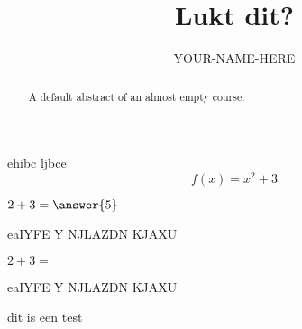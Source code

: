 \documentclass{ximera}
\title{Lukt dit?}
\author{YOUR-NAME-HERE}
\begin{document}
\begin{abstract}
    A default abstract of an almost empty course.
\end{abstract}
\maketitle

\begin{example}
    ehibc ljbce 
    \[ f(x)=x^2+3 \]
\end{example}

\begin{exercise}
    $2+3=\answer{5}$
    \begin{oplossing}
        eaIYFE Y NJLAZDN KJAXU
    \end{oplossing}
\end{exercise}
\begin{exercise}
    $2+3=$
    \begin{oplossing}[toon]
        eaIYFE Y NJLAZDN KJAXU
    \end{oplossing}
\end{exercise}

\begin{definition}
    dit is een test
\end{definition}
\end{document}
